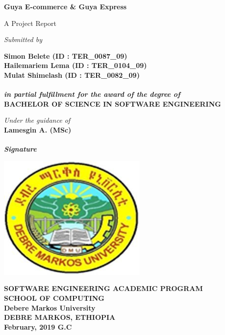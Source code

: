 \begin{titlepage}
\begin{center}
		\begin{LARGE}
			\bf{Guya E-commerce \& Guya Express\\}
		\end{LARGE}
		\vspace*{30pt}
		
		{\large A Project Report}
		\vspace{3.5\baselineskip}
		
		\textit{Submitted by}		
		
		\textbf{
			Simon Belete (ID : TER\_0087\_09)\\
			Hailemariem Lema (ID : TER\_0104\_09)\\
			Mulat Shimelash (ID : TER\_0082\_09)}\\		
		
		\textbf{\\
			\it{in partial fulfillment for the award of the degree of}\\}
		\vspace{20pt}
		\textbf{BACHELOR OF SCIENCE IN SOFTWARE ENGINEERING\\}
		
		\vspace{30pt}
		
		\vspace{30pt}
		\textit{Under the guidance of}\\
		\textbf{Lamesgin A.  (MSc)}\\
		\vspace{20pt}
		\textit{\textbf{\makebox[2in]{\hrulefill}}}\\
		\textit{\textbf{Signature}}
		
		
		\vspace{15pt}
		
		\includegraphics[scale=1]{images/dmu} 
		
		\textbf{SOFTWARE ENGINEERING ACADEMIC PROGRAM\\
			SCHOOL OF COMPUTING\\
			Debere Markos University\\
			DEBRE MARKOS, ETHIOPIA\\
			February, 2019 G.C
		}
	\end{center}
\end{titlepage}